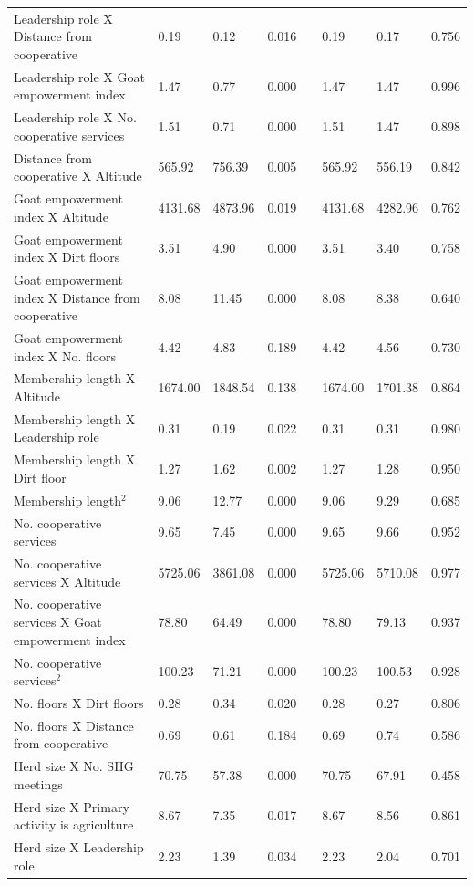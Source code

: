\documentclass[11pt]{article}
\begin{document}
\begin{table}[H]
{\begin{tabular}{llllllll}
Leadership role X Distance from cooperative & 0.19 & 0.12 & 0.016 & & 0.19 & 0.17 & 0.756 \\
Leadership role X Goat empowerment index & 1.47 & 0.77 & 0.000 & & 1.47 & 1.47 & 0.996 \\
Leadership role X No. cooperative services & 1.51 & 0.71 & 0.000 & & 1.51 & 1.47 & 0.898 \\
Distance from cooperative X Altitude & 565.92 & 756.39 & 0.005 & & 565.92 & 556.19 & 0.842 \\
Goat empowerment index X Altitude & 4131.68 & 4873.96 & 0.019 & & 4131.68 & 4282.96 & 0.762 \\
Goat empowerment index X Dirt floors & 3.51 & 4.90 & 0.000 & & 3.51 & 3.40 & 0.758 \\
Goat empowerment index X Distance from cooperative & 8.08 & 11.45 & 0.000 & & 8.08 & 8.38 & 0.640 \\
Goat empowerment index X No. floors & 4.42 & 4.83 & 0.189 & & 4.42 & 4.56 & 0.730 \\
Membership length X Altitude & 1674.00 & 1848.54 & 0.138 & & 1674.00 & 1701.38 & 0.864 \\
Membership length X Leadership role & 0.31 & 0.19 & 0.022 & & 0.31 & 0.31 & 0.980 \\
Membership length X Dirt floor & 1.27 & 1.62 & 0.002 & & 1.27 & 1.28 & 0.950 \\
Membership length$^2$ & 9.06 & 12.77 & 0.000 & & 9.06 & 9.29 & 0.685 \\
No. cooperative services & 9.65 & 7.45 & 0.000 & & 9.65 & 9.66 & 0.952 \\
No. cooperative services X Altitude & 5725.06 & 3861.08 & 0.000 & & 5725.06 & 5710.08 & 0.977 \\
No. cooperative services X Goat empowerment index & 78.80 & 64.49 & 0.000 & & 78.80 & 79.13 & 0.937 \\
No. cooperative services$^2$ & 100.23 & 71.21 & 0.000 & & 100.23 & 100.53 & 0.928 \\
No. floors X Dirt floors & 0.28 & 0.34 & 0.020 & & 0.28 & 0.27 & 0.806 \\
No. floors X Distance from cooperative & 0.69 & 0.61 & 0.184 & & 0.69 & 0.74 & 0.586 \\
Herd size X No. SHG meetings & 70.75 & 57.38 & 0.000 & & 70.75 & 67.91 & 0.458 \\
Herd size X Primary activity is agriculture & 8.67 & 7.35 & 0.017 & & 8.67 & 8.56 & 0.861 \\
Herd size X Leadership role & 2.23 & 1.39 & 0.034 & & 2.23 & 2.04 & 0.701 \\

\end{tabular}}
\end{table}
\end{document}
